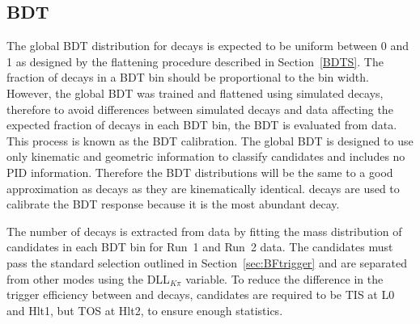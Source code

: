 \subsection{BDT \pdfs}
The global BDT distribution for \bmumu decays is expected to be uniform between 0 and 1 as designed by the flattening procedure described in Section~\ref{BDTS}. The fraction of \bmumu decays in a BDT bin should be proportional to the bin width. However, the global BDT was trained and flattened using simulated decays, therefore to avoid differences between simulated decays and data affecting the expected fraction of \bmumu decays in each BDT bin, the BDT \pdf is evaluated from data. This process is known as the BDT calibration.
The global BDT is designed to use only kinematic and geometric information to classify candidates and includes no PID information. Therefore the BDT distributions will be the same to a good approximation as \bmumu decays as they are kinematically identical. \bdkpi decays are used to calibrate the BDT response because it is the most abundant \bhh decay. 

The number of \bdkpi decays is extracted from data by fitting the mass distribution of \bdkpi candidates in each BDT bin for Run~1 and Run~2 data. The \bdkpi candidates must pass the standard \bhh selection outlined in Section~\ref{sec:BFtrigger} and are separated from other \bhh modes using the DLL$_{K\pi}$ variable. To reduce the difference in the trigger efficiency between \bdkip and \bmumu decays, \bdkpi candidates are required to be TIS at L0 and Hlt1, but TOS at Hlt2, to ensure enough statistics.

